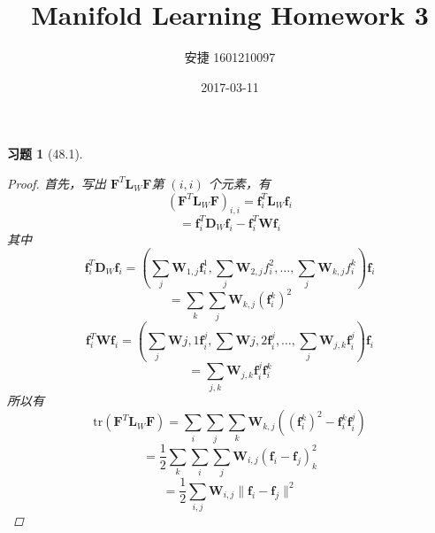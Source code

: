 \documentclass[a4paper, UTF8]{ctexart}
\title{Manifold Learning Homework 3}
\date{2017-03-11}
\author{安捷 1601210097}
\newtheorem*{exercise}{\textbf{习题}}
\begin{document}
\maketitle
  \begin{exercise}[48.1]
    \begin{proof}
      首先，写出 $\mathbf{F}^T \mathbf{L}_W \mathbf{F}$第 $\left( i,i \right)$ 个元素，有
      \begin{equation*}
        \left(\mathbf{F}^T \mathbf{L}_W \mathbf{F}\right)_{i,i} = \mathbf{f}_i^T \mathbf{L}_W \mathbf{f}_i
      \end{equation*}
      \begin{equation*}
        = \mathbf{f}_i^T \mathbf{D}_W \mathbf{f}_i - \mathbf{f}_i^T \mathbf{W} \mathbf{f}_i
      \end{equation*}
      其中
      \begin{equation*}
        \mathbf{f}_i^T \mathbf{D}_W \mathbf{f}_i = \left( \sum_j \mathbf{W}_{1,j} \mathbf{f}_i^1, \sum_j \mathbf{W}_{2,j}f_i^2, \dots, \sum_j \mathbf{W}_{k,j} f_i^k \right) \mathbf{f}_i
      \end{equation*}
      \begin{equation*}
        = \sum_k \sum_j \mathbf{W}_{k,j}\left( \mathbf{f}_i^k \right)^2
      \end{equation*}
      \begin{equation*}
        \mathbf{f}_i^T \mathbf{W} \mathbf{f}_i = \left( \sum_j \mathbf{W}{j,1}\mathbf{f}_i^j, \sum \mathbf{W}{j,2}\mathbf{f}_i^j, \dots, \sum_j \mathbf{W}_{j,k}\mathbf{f}_i^j \right)\mathbf{f}_i
      \end{equation*}
      \begin{equation*}
        = \sum_{j,k}\mathbf{W}_{j,k} \mathbf{f}_i^j \mathbf{f}_i^k
      \end{equation*}
      所以有
      \begin{equation*}
        \mathrm{tr}\left( \mathbf{F}^T \mathbf{L}_W \mathbf{F} \right) = \sum_i \sum_j \sum_k \mathbf{W}_{k,j} \left(\left(\mathbf{f}_i^k\right)^2 - \mathbf{f}_i^k \mathbf{f}_i^j \right)
      \end{equation*}
      \begin{equation*}
        = \frac{1}{2} \sum_k \sum_i \sum_j \mathbf{W}_{i,j} \left( \mathbf{f}_i - \mathbf{f}_j \right)_k^2
      \end{equation*}
      \begin{equation*}
        = \frac{1}{2} \sum_{i,j} \mathbf{W}_{i,j} \lVert \mathbf{f}_i - \mathbf{f}_j \rVert^2
      \end{equation*}
    \end{proof}
  \end{exercise}
\end{document}
